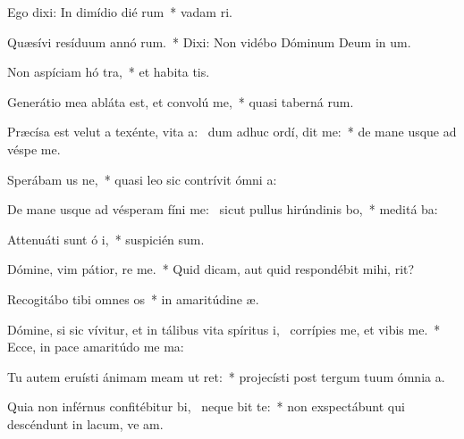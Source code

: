 \item Ego dixi: In dimídio dié rum~* vadam   ri.
\item Quæsívi resíduum annó rum.~* Dixi: Non vidébo Dóminum Deum in  um.
\item Non aspíciam hó tra,~* et habita tis.
\item Generátio mea abláta est, et convolú   me,~* quasi taberná rum.
\item Præcísa est velut a texénte, vita a:~\pscross{} dum adhuc ordí, dit me:~* de mane usque ad véspe  me.
\item Sperábam us  ne,~* quasi leo sic contrívit ómni  a:
\item De mane usque ad vésperam fíni me:~\pscross{} sicut pullus hirúndinis  bo,~* meditá  ba:
\item Attenuáti sunt ó i,~* suspicién  sum.
\item Dómine, vim pátior, re  me.~* Quid dicam, aut quid respondébit mihi,   rit?
\item Recogitábo tibi omnes  os~* in amaritúdine  æ.
\item Dómine, si sic vívitur, et in tálibus vita spíritus i,~\pscross{} corrípies me, et vibis me.~* Ecce, in pace amaritúdo me ma:
\item Tu autem eruísti ánimam meam ut  ret:~* projecísti post tergum tuum ómnia  a.
\item Quia non inférnus confitébitur bi,~\pscross{} neque  bit te:~* non exspectábunt qui descéndunt in lacum, ve am.
